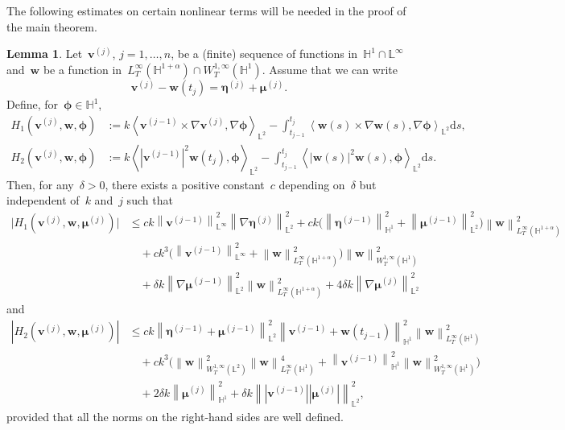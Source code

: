 \documentclass[11pt,reqno]{amsart}
\theoremstyle{definition}
\newtheorem{lemma}[theorem]{Lemma}
\numberwithin{equation}{section}
\newcommand{\bff}{\boldsymbol}
\newcommand{\bb}{\mathbb}
\newcommand{\ds}{\mathrm{d}s}
\newcommand{\nn}{\nonumber}
\newcommand{\norm}[2]{\left\|{#1}\right\|_{#2}}
\newcommand{\inpro}[2]{\left\langle#1,#2\right\rangle}
\begin{document}
The following estimates on certain nonlinear terms will be needed in the proof of the main theorem.

\begin{lemma}
	\label{lem:aux lem}
	Let~$\bff{v}^{(j)}$, $j=1,\ldots,n$, be a (finite) sequence of functions
	in~$\bb{H}^1\cap \bb{L}^\infty$ and~$\bff{w}$ be a function in~$L^\infty_T(\bb{H}^{1+\alpha})\cap
	W^{1,\infty}_T(\bb{H}^1)$. Assume that we can write
	\[
	\bff{v}^{(j)} - \bff{w}(t_j)
	=
	\bff{\eta}^{(j)} + \bff{\mu}^{(j)}.
	\]
	Define, for~$\bff{\phi}\in\bb{H}^1$,
	\begin{align*} 
		H_1(\bff{v}^{(j)},\bff{w},\bff{\phi})
		&:=
		k \inpro{\bff{v}^{(j-1)} \times \nabla\bff{v}^{(j)}}%
		{\nabla\bff{\phi}}_{\bb{L}^2}
		-
		\int_{t_{j-1}}^{t_j} 
		\inpro{\bff{w}(s) \times \nabla\bff{w}(s)}%
		{\nabla\bff{\phi}}_{\bb{L}^2} \ds,
		\\
		H_2(\bff{v}^{(j)},\bff{w},\bff{\phi})
		&:=
		k \inpro{|\bff{v}^{(j-1)}|^2 \bff{w}(t_j)}{\bff{\phi}}_{\bb{L}^2}
		-
		\int_{t_{j-1}}^{t_j} 
		\inpro{|\bff{w}(s)|^2 \bff{w}(s)}{\bff{\phi}}_{\bb{L}^2} \ds.
	\end{align*}
	Then, for any~$ \delta>0$, there exists a positive constant~$c$
	depending on~$\delta$ but independent of~$k$ and~$j$ such that
	\begin{align}\label{equ:H1 vj}
			\big| H_1(\bff{v}^{(j)},\bff{w},\bff{\mu}^{(j)}) \big|
			&\le
			ck\norm{\bff{v}^{(j-1)}}{\bb{L}^\infty}^2
			\norm{\nabla\bff{\eta}^{(j)}}{\bb{L}^2}^2
			+
			ck
			\Big(\norm{\bff{\eta}^{(j-1)}}{\bb{H}^1}^2
			+ \norm{\bff{\mu}^{(j-1)}}{\bb{L}^2}^2 \Big)
			\norm{\bff{w}}{L^\infty_T(\bb{H}^{1+\alpha})}^2
			\nn\\
			&\quad
			+
			c k^3
			\Big(
			\norm{\bff{v}^{(j-1)}}{\bb{L}^\infty}^2
			+
			\norm{\bff{w}}{L^\infty_T(\bb{H}^{1+\alpha})}^2
			\Big)  	\norm{\bff{w}}{W^{1,\infty}_T(\bb{H}^1)}^2
			\nn\\
			&\quad
			+ \delta k \norm{\nabla\bff{\mu}^{(j-1)}}{\bb{L}^2}^2 \norm{\bff{w}}{L^\infty_T(\bb{H}^{1+\alpha})}^2
			+ 4 \delta k \norm{\nabla\bff{\mu}^{(j)}}{\bb{L}^2}^2
	\end{align}
	and
	\begin{align}\label{equ:H2 vj}
			| H_2(\bff{v}^{(j)},\bff{w},\bff{\mu}^{(j)}) |
			&\le
			ck
			\norm{\bff{\eta}^{(j-1)}+\bff{\mu}^{(j-1)}}{\bb{L}^2}^2
			\norm{\bff{v}^{(j-1)}+\bff{w}(t_{j-1})}{\bb{H}^1}^2
			\norm{\bff{w}}{L^\infty_T(\bb{H}^1)}^2
			\nn\\
			&\quad
			+
			ck^3
			\Big(
			\norm{\bff{w}}{W^{1,\infty}_T(\bb{L}^2)}^2
			\norm{\bff{w}}{L^\infty_T(\bb{H}^1)}^4
			+
			\norm{\bff{v}^{(j-1)}}{\bb{H}^1}^2
			\norm{\bff{w}}{W^{1,\infty}_T(\bb{H}^1)}^2
			\Big)
			\nn\\
			&\quad
			+
			2 \delta k \norm{\bff{\mu}^{(j)}}{\bb{H}^1}^2
			+
			\delta k
			\norm{|\bff{v}^{(j-1)}||\bff{\mu}^{(j)}|}{\bb{L}^2}^2,
	\end{align}
	provided that all the norms on the right-hand sides are well defined.


\end{lemma}
\end{document}
